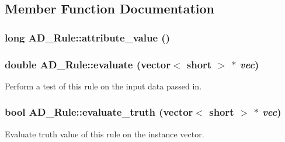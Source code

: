 \subsection{Member Function Documentation}
\hypertarget{classAD__Rule_ad0b4a6286800e1d8f6e7ac10be8dd691}{
\subsubsection[{attribute\_\-value}]{\setlength{\rightskip}{0pt plus 5cm}long AD\_\-Rule::attribute\_\-value ()}}
\label{classAD__Rule_ad0b4a6286800e1d8f6e7ac10be8dd691}
\hypertarget{classAD__Rule_ab6f961c488d71dd882b3341b3b07c379}{
\subsubsection[{evaluate}]{\setlength{\rightskip}{0pt plus 5cm}double AD\_\-Rule::evaluate (vector$<$ short $>$ $\ast$ {\em vec})}}
\label{classAD__Rule_ab6f961c488d71dd882b3341b3b07c379}
Perform a test of this rule on the input data passed in. \hypertarget{classAD__Rule_aaa7a8e038626e611ebc8176b92d6b95b}{
\subsubsection[{evaluate\_\-truth}]{\setlength{\rightskip}{0pt plus 5cm}bool AD\_\-Rule::evaluate\_\-truth (vector$<$ short $>$ $\ast$ {\em vec})}}
\label{classAD__Rule_aaa7a8e038626e611ebc8176b92d6b95b}
Evaluate truth value of this rule on the instance vector.

